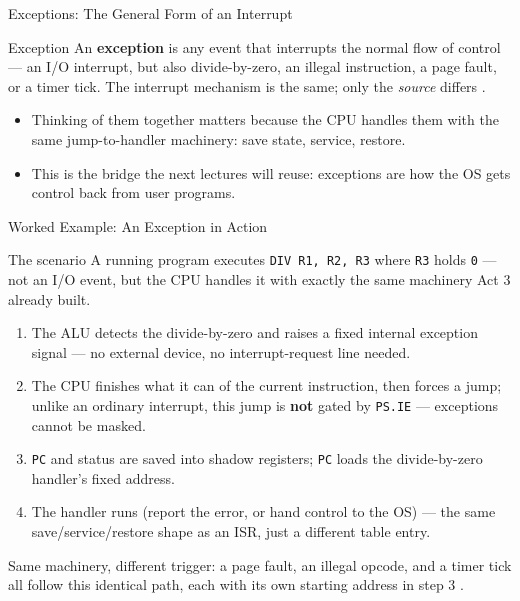 \documentclass[aspectratio=169]{beamer}
\begin{document}
\begin{frame}{Exceptions: The General Form of an Interrupt}
  \begin{block}{Exception}
    An \textbf{exception} is any event that interrupts the normal flow of
    control --- an I/O interrupt, but also divide-by-zero, an illegal
    instruction, a page fault, or a timer tick. The interrupt mechanism is the
    same; only the \emph{source} differs
    \cite{Hamacher2002_computer_organization,PattersonHennessy2017_computer_organization_design}.
  \end{block}
  \begin{itemize}
    \item Thinking of them together matters because the CPU handles them with
      the same jump-to-handler machinery: save state, service, restore.
    \item This is the bridge the next lectures will reuse: exceptions are how
      the OS gets control back from user programs.
  \end{itemize}
\end{frame}

\begin{frame}{Worked Example: An Exception in Action}
  \begin{block}{The scenario}
    A running program executes \texttt{DIV R1, R2, R3} where \texttt{R3}
    holds \texttt{0} --- not an I/O event, but the CPU handles it with
    exactly the same machinery Act 3 already built.
  \end{block}
  \vspace{-0.1cm}
  \begin{enumerate}
    \item The ALU detects the divide-by-zero and raises a fixed internal
      exception signal --- no external device, no interrupt-request line
      needed.
    \item The CPU finishes what it can of the current instruction, then
      forces a jump; unlike an ordinary interrupt, this jump is
      \textbf{not} gated by \texttt{PS.IE} --- exceptions cannot be masked.
    \item \texttt{PC} and status are saved into shadow registers; \texttt{PC}
      loads the divide-by-zero handler's fixed address.
    \item The handler runs (report the error, or hand control to the OS)
      --- the same save/service/restore shape as an ISR, just a different
      table entry.
  \end{enumerate}
  Same machinery, different trigger: a page fault, an illegal opcode,
  and a timer tick all follow this identical path, each with its own
  starting address in step 3 \cite{Hamacher2002_computer_organization,PattersonHennessy2017_computer_organization_design}.
\end{frame}
\end{document}
